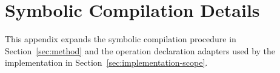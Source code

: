 \section{Symbolic Compilation Details}
\label{app:compilation}
This appendix expands the symbolic compilation procedure in
Section~\ref{sec:method} and the operation declaration adapters used by
the implementation in Section~\ref{sec:implementation-scope}.


\FloatBarrier

\FloatBarrier

\FloatBarrier

\FloatBarrier


\FloatBarrier

\FloatBarrier


